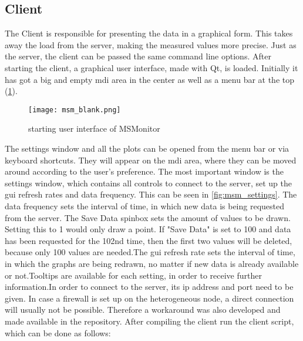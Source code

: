 \subsection{Client}
The Client is responsible for presenting the data in a graphical form. This takes away the load from the server, making the measured values more precise.\newline
Just as the server, the client can be passed the same command line options.\newline
After starting the client, a graphical user interface, made with Qt, is loaded. Initially it has got a big and empty mdi area in the center as well as a menu bar at the top (\ref{fig:msm_blank}).\newline
\begin{figure}[t!]
	\begin{center}
		\texttt{[image: msm\_blank.png]} 
		\caption{starting user interface of MSMonitor}
		\label{fig:msm_blank}
	\end{center}
\end{figure}
The settings window and all the plots can be opened from the menu bar or via keyboard shortcuts. They will appear on the mdi area, where they can be moved around according to the user's preference.\newline
The most important window is the settings window, which contains all controls to connect to the server, set up the gui refresh rates and data frequency. This can be seen in \ref{fig:msm_settings}. The data frequency sets the interval of time, in which new data is being requested from the server. The Save Data spinbox sets the amount of values to be drawn. Setting this to 1 would only draw a point. If "Save Data" is set to 100 and data has been requested for the 102nd time, then the first two values will be deleted, because only 100 values are needed.\newline The gui refresh rate sets the interval of time, in which the graphs are being redrawn, no matter if new data is already available or not.\newline Tooltips are available for each setting, in order to receive further information.\newline In order to connect to the server, its ip address and port need to be given. In case a firewall is set up on the heterogeneous node, a direct connection will usually not be possible. Therefore a workaround was also developed and made available in the repository.\newline
After compiling the client run the client script, which can be done as follows:
